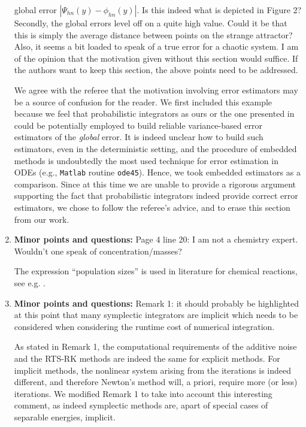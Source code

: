 \documentclass[10pt]{article}
\begin{document}
\begin{enumerate}
\begin{itquote}
		global error $|\Psi_{hn}(y)−\phi_{hn}(y)|$. Is this indeed what is depicted in Figure 2? Secondly, the global errors level off on a quite high value. Could it be that this is simply the average distance between points on the strange attractor? Also, it seems a bit loaded to speak of a true error for a chaotic system. I am of the opinion that the motivation given without this section would suffice. If the authors want to keep this section, the above points need to be	addressed.
	\end{itquote}
	We agree with the referee that the motivation involving error estimators may be a source of confusion for the reader. We first included this example because we feel that probabilistic integrators as ours or the one presented in \cite{CGS17} could be potentially employed to build reliable variance-based error estimators of the \textit{global} error. It is indeed unclear how to build such estimators, even in the deterministic setting, and the procedure of embedded methods is undoubtedly the most used technique for error estimation in ODEs (e.g., \texttt{Matlab} routine \texttt{ode45}). Hence, we took embedded estimators as a comparison. Since at this time we are unable to provide a rigorous argument supporting the fact that probabilistic integrators indeed provide correct error estimators, we chose to follow the referee's advice, and to erase this section from our work.
	\item 
	\begin{itquote} 
		\textbf{Minor points and questions:} Page 4 line 20: I am not a chemistry expert. Wouldn't one speak of concentration/masses?
	\end{itquote}
	The expression ``population sizes'' is used in literature for chemical reactions, see e.g. \cite{HAL12}.
	\item 
	\begin{itquote} 
		\textbf{Minor points and questions:} Remark 1: it should probably be highlighted at this point that many symplectic integrators are implicit which needs to be considered when considering the runtime cost of numerical integration.
	\end{itquote}
	As stated in Remark 1, the computational requirements of the additive noise and the RTS-RK methods are indeed the same for explicit methods. For implicit methods, the nonlinear system arising from the iterations is indeed different, and therefore Newton's method will, a priori, require more (or less) iterations. We modified Remark 1 to take into account this interesting comment, as indeed symplectic methods are, apart of special cases of separable energies, implicit.

\end{enumerate}
\end{document}
